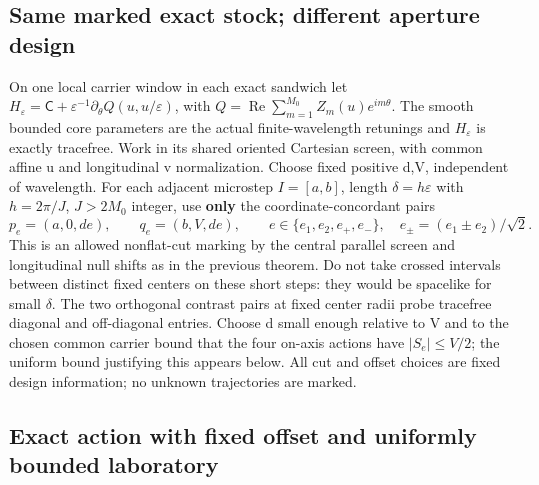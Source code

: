 \documentclass[11pt]{article}
\begin{document}
\subsection{Same marked exact stock; different aperture design}\label{same-marked-exact-stock-different-aperture-design}

On one local carrier window in each exact sandwich let \(H_\varepsilon=\mathsf C+\varepsilon^{-1}\partial_\theta Q(u,u/\varepsilon)\), with
\(Q=\operatorname{Re}\sum_{m=1}^{M_0} Z_m(u)e^{im\theta}\).
The smooth bounded core parameters are the actual finite-wavelength retunings and \(H_\varepsilon\) is exactly tracefree. Work in its shared oriented Cartesian screen, with common affine u and longitudinal v normalization. Choose fixed positive d,V, independent of wavelength. For each adjacent microstep \(I=[a,b]\), length \(\delta=h\varepsilon\) with \(h=2\pi/J\), \(J>2M_0\) integer, use \textbf{only} the coordinate-concordant pairs
\[
 p_e=(a,0,de),\qquad q_e=(b,V,de),\qquad
 e\in\{e_1,e_2,e_+,e_-\},\quad e_\pm=(e_1\pm e_2)/\sqrt2.
\]
This is an allowed nonflat-cut marking by the central parallel screen and longitudinal null shifts as in the previous theorem. Do not take crossed intervals between distinct fixed centers on these short steps: they would be spacelike for small \(\delta\). The two orthogonal contrast pairs at fixed center radii probe tracefree diagonal and off-diagonal entries. Choose d small enough relative to V and to the chosen common carrier bound that the four on-axis actions have \(|S_e|\le V/2\); the uniform bound justifying this appears below. All cut and offset choices are fixed design information; no unknown trajectories are marked.

\subsection{Exact action with fixed offset and uniformly bounded laboratory}\label{exact-action-with-fixed-offset-and-uniformly-bounded-laboratory}
\end{document}
